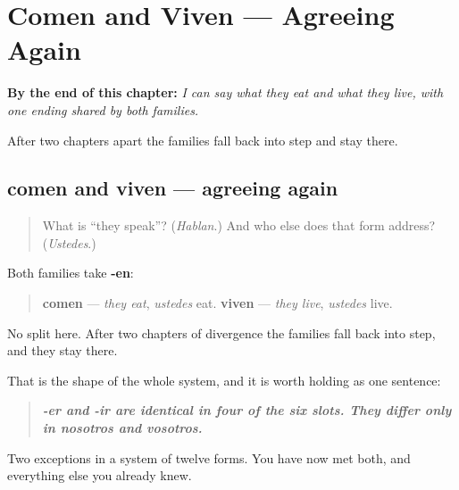 
\chapter{Comen and Viven --- Agreeing Again}
\label{ch:spanish-er-ir-3pl}

\begin{chapteropening}
\textbf{By the end of this chapter:} \emph{I can say what they eat and what they live, with one ending shared by both families.}

After two chapters apart the families fall back into step and stay there.
\end{chapteropening}

\section[comen · viven]{comen and viven — agreeing again}

\label{lesson:ES-C07-comen-viven}



\begin{quote}
What is \textquotedblleft{}they speak\textquotedblright{}? (\emph{Hablan}.) And who else does that form address? (\emph{Ustedes}.)
\end{quote}

\begin{grammarlens}[title={Grammar Lens: one ending for both}]
Both families take \textbf{-en}:

\begin{quote}
\textbf{comen} — \emph{they eat}, \emph{ustedes} eat. \textbf{viven} — \emph{they live}, \emph{ustedes} live.
\end{quote}

No split here. After two chapters of divergence the families fall back into step, and they stay there.

That is the shape of the whole system, and it is worth holding as one sentence:

\begin{quote}
\emph{\textbf{-er\emph{ and }-ir\emph{ are identical in four of the six slots. They differ only in }nosotros\emph{ and }vosotros\emph{.\textbf{}}}}
\end{quote}

Two exceptions in a system of twelve forms. You have now met both, and everything else you already knew.
\end{grammarlens}

